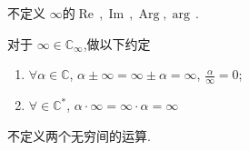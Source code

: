 \documentclass[../../复变函数.tex]{subfiles}
\begin{document}
\begin{remark}
    不定义  \(  \infty  \)的\(  \operatorname{Re}\,,\operatorname{Im}\,,\operatorname{Arg},\operatorname{arg}\,  \).
\end{remark}

\begin{definition}
    对于 \(  \infty \in \mathbb{C} _{\infty}  \),做以下约定 \begin{enumerate}
        \item \(  \forall   \alpha  \in \mathbb{C}   \), \(  \alpha \pm \infty =  \infty\pm  \alpha  =  \infty  \), \(  \frac{\alpha  }{\infty }   = 0\);
        \item \(  \forall  \in \mathbb{C} ^{*}  \), \(  \alpha \cdot \infty= \infty\cdot \alpha  =  \infty  \)     
    \end{enumerate}
     
\end{definition}

\begin{remark}
    不定义两个无穷间的运算.
\end{remark}
\end{document}
